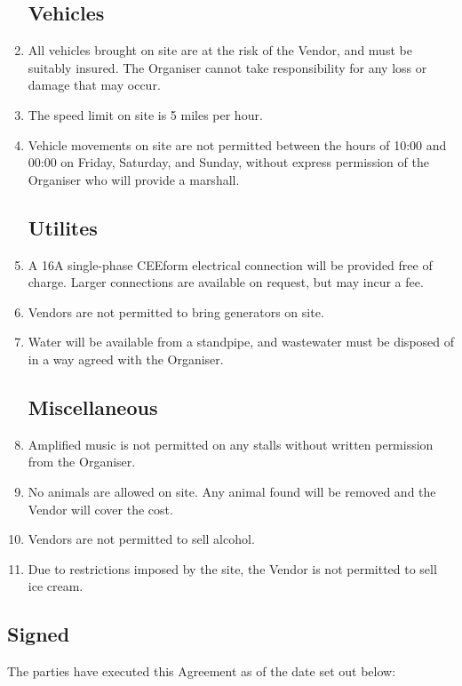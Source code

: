 \begin{enumerate}
\subsection*{Vehicles}
\item All vehicles brought on site are at the risk of the Vendor, and must be suitably insured.
        The Organiser cannot take responsibility for any loss or damage that may occur.
\item The speed limit on site is 5 miles per hour.
\item Vehicle movements on site are not permitted between the hours of 10:00 and 00:00 on
      Friday, Saturday, and Sunday, without express permission of the Organiser who will provide
      a marshall.

\subsection*{Utilites}
\item A 16A single-phase CEEform electrical connection will be provided free of charge. Larger
        connections are available on request, but may incur a fee.
\item Vendors are not permitted to bring generators on site.
\item Water will be available from a standpipe, and wastewater must be disposed of in a way
        agreed with the Organiser.

\subsection*{Miscellaneous}
\item Amplified music is not permitted on any stalls without written permission from the Organiser.
\item No animals are allowed on site. Any animal found will be removed and the Vendor will
        cover the cost.
\item Vendors are not permitted to sell alcohol.
\item Due to restrictions imposed by the site, the Vendor is not permitted to sell ice cream.

\end{enumerate}

\subsection*{Signed}
The parties have executed this Agreement as of the date set out below:




